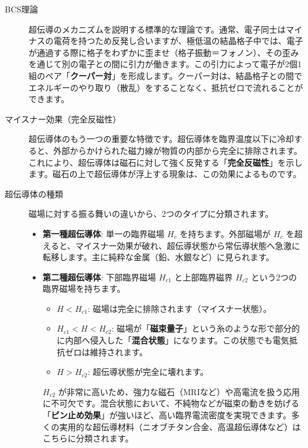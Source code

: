 \documentclass[11pt,a4paper]{ltjsarticle}
\begin{document}
\begin{description}
    \item[BCS理論]
    超伝導のメカニズムを説明する標準的な理論です。通常、電子同士はマイナスの電荷を持つため反発し合いますが、極低温の結晶格子中では、電子が通過する際に格子をわずかに歪ませ（格子振動＝フォノン）、その歪みを通じて別の電子との間に引力が働きます。この引力によって電子が2個1組のペア「\textbf{クーパー対}」を形成します。クーパー対は、結晶格子との間でエネルギーのやり取り（散乱）をすることなく、抵抗ゼロで流れることができます。

    \item[マイスナー効果（完全反磁性）]
    超伝導体のもう一つの重要な特徴です。超伝導体を臨界温度以下に冷却すると、外部からかけられた磁力線が物質の内部から完全に排除されます。これにより、超伝導体は磁石に対して強く反発する「\textbf{完全反磁性}」を示します。磁石の上で超伝導体が浮上する現象は、この効果によるものです。

    \item[超伝導体の種類]
    磁場に対する振る舞いの違いから、2つのタイプに分類されます。
    \begin{itemize}
        \item \textbf{第一種超伝導体}:
        単一の臨界磁場 $H_c$ を持ちます。外部磁場が $H_c$ を超えると、マイスナー効果が破れ、超伝導状態から常伝導状態へ急激に転移します。主に純粋な金属（鉛、水銀など）に見られます。

        \item \textbf{第二種超伝導体}:
        下部臨界磁場 $H_{c1}$ と上部臨界磁界 $H_{c2}$ という2つの臨界磁場を持ちます。
        \begin{itemize}
            \item $H < H_{c1}$: 磁場は完全に排除されます（マイスナー状態）。
            \item $H_{c1} < H < H_{c2}$: 磁場が「\textbf{磁束量子}」という糸のような形で部分的に内部へ侵入した「\textbf{混合状態}」になります。この状態でも電気抵抗ゼロは維持されます。
            \item $H > H_{c2}$: 超伝導状態が完全に壊れます。
        \end{itemize}
        $H_{c2}$ が非常に高いため、強力な磁石（MRIなど）や高電流を扱う応用に不可欠です。混合状態において、不純物などが磁束の動きを妨げる「\textbf{ピン止め効果}」が強いほど、高い臨界電流密度を実現できます。多くの実用的な超伝導材料（ニオブチタン合金、高温超伝導体など）はこちらに分類されます。
    \end{itemize}
\end{description}
\end{document}
